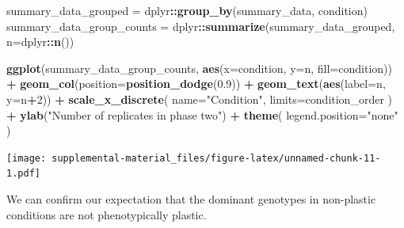 \documentclass[]{book}
\newenvironment{Shaded}{\begin{snugshade}}{\end{snugshade}}
\newcommand{\DataTypeTok}[1]{\textcolor[rgb]{0.13,0.29,0.53}{#1}}
\newcommand{\DecValTok}[1]{\textcolor[rgb]{0.00,0.00,0.81}{#1}}
\newcommand{\FloatTok}[1]{\textcolor[rgb]{0.00,0.00,0.81}{#1}}
\newcommand{\KeywordTok}[1]{\textcolor[rgb]{0.13,0.29,0.53}{\textbf{#1}}}
\newcommand{\NormalTok}[1]{#1}
\newcommand{\OperatorTok}[1]{\textcolor[rgb]{0.81,0.36,0.00}{\textbf{#1}}}
\newcommand{\StringTok}[1]{\textcolor[rgb]{0.31,0.60,0.02}{#1}}
\begin{document}
\begin{Shaded}
\begin{Highlighting}[]
\NormalTok{summary_data_grouped =}\StringTok{ }\NormalTok{dplyr}\OperatorTok{::}\KeywordTok{group_by}\NormalTok{(summary_data, condition)}
\NormalTok{summary_data_group_counts =}\StringTok{ }\NormalTok{dplyr}\OperatorTok{::}\KeywordTok{summarize}\NormalTok{(summary_data_grouped, }\DataTypeTok{n=}\NormalTok{dplyr}\OperatorTok{::}\KeywordTok{n}\NormalTok{())}

\KeywordTok{ggplot}\NormalTok{(summary_data_group_counts, }\KeywordTok{aes}\NormalTok{(}\DataTypeTok{x=}\NormalTok{condition, }\DataTypeTok{y=}\NormalTok{n, }\DataTypeTok{fill=}\NormalTok{condition)) }\OperatorTok{+}
\StringTok{  }\KeywordTok{geom_col}\NormalTok{(}\DataTypeTok{position=}\KeywordTok{position_dodge}\NormalTok{(}\FloatTok{0.9}\NormalTok{)) }\OperatorTok{+}
\StringTok{  }\KeywordTok{geom_text}\NormalTok{(}\KeywordTok{aes}\NormalTok{(}\DataTypeTok{label=}\NormalTok{n, }\DataTypeTok{y=}\NormalTok{n}\OperatorTok{+}\DecValTok{2}\NormalTok{)) }\OperatorTok{+}
\StringTok{  }\KeywordTok{scale_x_discrete}\NormalTok{(}
    \DataTypeTok{name=}\StringTok{"Condition"}\NormalTok{,}
    \DataTypeTok{limits=}\NormalTok{condition_order}
\NormalTok{  ) }\OperatorTok{+}
\StringTok{  }\KeywordTok{ylab}\NormalTok{(}\StringTok{"Number of replicates in phase two"}\NormalTok{) }\OperatorTok{+}
\StringTok{  }\KeywordTok{theme}\NormalTok{(}
    \DataTypeTok{legend.position=}\StringTok{"none"}
\NormalTok{  )}
\end{Highlighting}
\end{Shaded}

\texttt{[image: supplemental-material\_files/figure-latex/unnamed-chunk-11-1.pdf]}

We can confirm our expectation that the dominant genotypes in non-plastic conditions are not phenotypically plastic.
\end{document}
